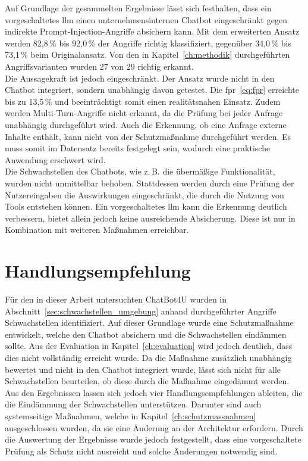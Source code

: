 Auf Grundlage der gesammelten Ergebnisse lässt sich festhalten, dass ein vorgeschaltetes \ac{llm} einen unternehmensinternen Chatbot eingeschränkt gegen indirekte
Prompt-Injection-Angriffe absichern kann. Mit dem erweiterten Ansatz werden 82,8\,\% bis 92,0\,\% der Angriffe richtig klassifiziert, gegenüber 34,0\,\% bis 73,1\,\%
beim Originalansatz. Von den in Kapitel~\ref{ch:methodik} durchgeführten Angriffsvarianten wurden 27 von 29 richtig erkannt. \\
Die Aussagekraft ist jedoch eingeschränkt. Der Ansatz wurde nicht in den Chatbot integriert, sondern unabhängig davon getestet. Die \ac{fpr}~\eqref{eq:fpr} erreichte bis zu
13,5\,\% und beeinträchtigt somit einen realitätsnahen Einsatz. Zudem werden Multi-Turn-Angriffe nicht erkannt, da die Prüfung bei jeder Anfrage
unabhängig durchgeführt wird. Auch die Erkennung, ob eine Anfrage externe Inhalte enthält, kann nicht von der Schutzmaßnahme durchgeführt werden. Es muss somit im
Datensatz bereits festgelegt sein, wodurch eine praktische Anwendung erschwert wird. \\
Die Schwachstellen des Chatbots, wie z.\,B. die übermäßige Funktionalität, wurden nicht unmittelbar behoben. Stattdessen werden durch eine Prüfung der Nutzereingaben die
Auswirkungen eingeschränkt, die durch die Nutzung von Tools entstehen können. Ein vorgeschaltetes \ac{llm} kann die Erkennung deutlich verbessern, bietet allein
jedoch keine ausreichende Absicherung. Diese ist nur in Kombination mit weiteren Maßnahmen erreichbar.

\section{Handlungsempfehlung}

Für den in dieser Arbeit untersuchten ChatBot4U wurden in Abschnitt~\ref{sec:schwachstellen_umgebung} anhand durchgeführter Angriffe Schwachstellen identifiziert.
Auf dieser Grundlage wurde eine Schutzmaßnahme entwickelt, welche den Chatbot absichern und die Schwachstellen eindämmen sollte. Aus der Evaluation in
Kapitel~\ref{ch:evaluation} wird jedoch deutlich, dass dies nicht vollständig erreicht wurde. Da die Maßnahme zusätzlich unabhängig bewertet und nicht in den
Chatbot integriert wurde, lässt sich nicht für alle Schwachstellen beurteilen, ob diese durch die Maßnahme eingedämmt werden. Aus den Ergebnissen lassen sich jedoch vier
Handlungsempfehlungen ableiten, die die Eindämmung der Schwachstellen unterstützen. Darunter sind auch systemseitige Maßnahmen, welche in Kapitel~\ref{ch:schutzmassnahmen}
ausgeschlossen wurden, da sie eine Änderung an der Architektur erfordern. Durch die Auswertung der Ergebnisse wurde jedoch festgestellt, dass eine 
vorgeschaltete Prüfung als Schutz nicht ausreicht und solche Änderungen notwendig sind.

